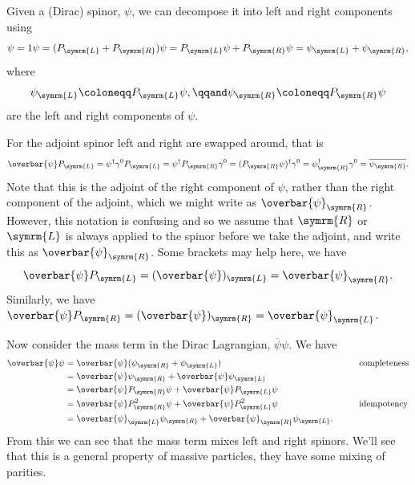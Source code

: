\documentclass[fleqn]{NotesClass}
\newcommand{\diracadjoint}[1]{\overbar{#1}}
\newcommand{\hermit}{\dagger}
\newcommand{\Left}{\symrm{L}}
\newcommand{\Right}{\symrm{R}}
\begin{document}
    Given a (Dirac) spinor, \(\psi\), we can decompose it into left and right components using
    \begin{equation}
        \psi = 1\psi = (P_{\Left} + P_{\Right})\psi = P_{\Left}\psi + P_{\Right}\psi = \psi_{\Left} + \psi_{\Right},
    \end{equation}
    where
    \begin{equation}
        \psi_{\Left} \coloneqq P_{\Left}\psi, \qqand \psi_{\Right} \coloneqq P_{\Right}\psi
    \end{equation}
    are the left and right components of \(\psi\).
    
    For the adjoint spinor left and right are swapped around, that is
    \begin{equation}
        \diracadjoint{\psi}P_{\Left} = \psi^\hermit \gamma^0 P_{\Left} = \psi^\hermit P_{\Right} \gamma^0 = (P_{\Right} \psi)^\hermit \gamma^0 = \psi_{\Right}^\hermit \gamma^0 = \overline{\psi_{\Right}}.
    \end{equation}
    Note that this is the adjoint of the right component of \(\psi\), rather than the right component of the adjoint, which we might write as \(\diracadjoint{\psi}_{\Right}\).
    However, this notation is confusing and so we assume that \(\Right\) or \(\Left\) is always applied to the spinor before we take the adjoint, and write this as \(\diracadjoint{\psi}_{\Right}\).
    Some brackets may help here, we have
    \begin{equation}
        \diracadjoint{\psi}P_{\Left} = (\diracadjoint{\psi})_{\Left} = \diracadjoint{\psi}_{\Right}.
    \end{equation}
    Similarly, we have \(\diracadjoint{\psi}P_{\Right} = (\diracadjoint{\psi})_{\Right} = \diracadjoint{\psi}_{\Left}\).
    
    Now consider the mass term in the Dirac Lagrangian, \(\diracadjoint{\psi}\psi\).
    We have
    \begin{alignat}{3}
        \diracadjoint{\psi} \psi &= \diracadjoint{\psi}(\psi_{\Right} + \psi_{\Left}) \qquad\qquad && \text{completeness}\\
        &= \diracadjoint{\psi}\psi_{\Right} + \diracadjoint{\psi}\psi_{\Left} \qquad\qquad && \\
        &= \diracadjoint{\psi}P_{\Right}\psi + \diracadjoint{\psi}P_{\Left}\psi \qquad\qquad && \\
        &= \diracadjoint{\psi}P_{\Right}^2\psi + \diracadjoint{\psi}P_{\Left}^2\psi \qquad\qquad && \text{idempotency}\\
        &= \diracadjoint{\psi}_{\Left}\psi_{\Right} + \diracadjoint{\psi}_{\Right}\psi_{\Left}. \qquad &&
    \end{alignat}
    From this we can see that the mass term mixes left and right spinors.
    We'll see that this is a general property of massive particles, they have some mixing of parities.
    
\end{document}
